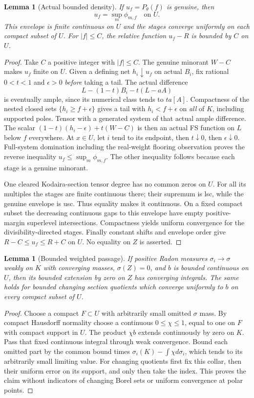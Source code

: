 \documentclass[10pt]{article}
\newtheorem{lemma}[theorem]{Lemma}
\begin{document}
\begin{lemma}[Actual bounded density]\label{density}
If $u_f=P_\theta(f)$ is genuine, then
\[
 u_f=\sup_m\phi_{m,f}\quad\text{on }U.
\]
This envelope is finite continuous on $U$ and the stages converge
uniformly on each compact subset of $U$. For $|f|\leq C$, the relative
function $u_f-R$ is bounded by $C$ on $U$.
\end{lemma}
\begin{proof}
Take $C$ a positive integer with $|f|\leq C$. The genuine minorant
$W-C$ makes $u_f$ finite on $U$. Given a defining net $h_i\downarrow u_f$
on actual $B_i$, fix rational $0<t<1$ and $\epsilon>0$ \emph{before}
taking a tail. The actual difference
\[
 L-(1-t)B_i-t(L-aA)
\]
is eventually ample, since its numerical class tends to $ta[A]$.
Compactness of the nested closed sets $\{h_i\geq f+\epsilon\}$ gives
a tail with $h_i<f+\epsilon$ on \emph{all} of $K$, including supported
poles. Tensor with a generated system of that actual ample difference.
The scalar $(1-t)(h_i-\epsilon)+t(W-C)$ is then an actual FS function
on $L$ below $f$ everywhere. At $x\in U$, let $i$ tend to its endpoint,
then $t\downarrow0$, then $\epsilon\downarrow0$. Full-system domination
including the real-weight flooring observation proves the reverse
inequality $u_f\leq\sup_m\phi_{m,f}$. The other inequality follows
because each stage is a genuine minorant.

One cleared Kodaira-section tensor degree has no common zeros on $U$.
For all its multiples the stages are finite continuous there; their
supremum is lsc, while the genuine envelope is usc. Thus equality makes
it continuous. On a fixed compact subset the decreasing continuous gaps
to this envelope have empty positive-margin superlevel intersections.
Compactness yields uniform convergence for the divisibility-directed
stages. Finally constant shifts and envelope order give
$R-C\leq u_f\leq R+C$ on $U$. No equality on $Z$ is asserted.
\end{proof}

\begin{lemma}[Bounded weighted passage]\label{bounded-passage}
If positive Radon measures $\sigma_i\to\sigma$ weakly on $K$ with
converging masses, $\sigma(Z)=0$, and $b$ is bounded continuous on $U$,
then its bounded extension by zero on $Z$ has converging integrals.
The same holds for bounded changing section quotients which converge
uniformly to $b$ on every compact subset of $U$.
\end{lemma}
\begin{proof}
Choose a compact $F\subset U$ with arbitrarily small omitted $\sigma$
mass. By compact Hausdorff normality choose a continuous $0\leq\chi\leq1$,
equal to one on $F$ with compact support in $U$. The product $\chi b$
extends continuously by zero on $K$. Pass that fixed continuous integral
through weak convergence. Bound each omitted part by the common bound
times $\sigma_i(K)-\int\chi d\sigma_i$, which tends to its arbitrarily
small limiting value. For changing quotients first fix this collar,
then their uniform error on its support, and only then take the index.
This proves the claim without indicators of changing Borel sets or
uniform convergence at polar points.
\end{proof}
\end{document}
